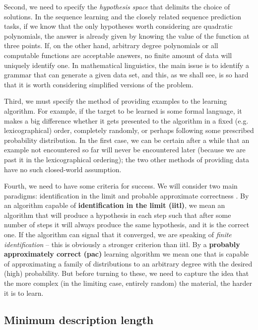Second, we need to specify the {\it hypothesis space} that delimits the choice
of solutions. In the sequence learning and the closely related sequence
prediction tasks, if we know that the only hypotheses worth considering are
quadratic polynomials, the answer is already given by knowing the value of the
function at three points. If, on the other hand, arbitrary degree polynomials
or all computable functions are acceptable answers, no finite amount of data
will uniquely identify one. In mathematical linguistics, the main issue is to
identify a grammar that can generate a given data set, and this, as we shall
see, is so hard that it is worth considering simplified versions of the
problem.

Third, we must specify the method of providing examples to the learning
algorithm. For example, if the target to be learned is some formal language,
it makes a big difference whether it gets presented to the algorithm in a
fixed (e.g. lexicographical) order, completely randomly, or perhaps following
some prescribed probability distribution. In the first case, we can be certain
after a while that an example not encountered so far will never be encountered
later (because we are past it in the lexicographical ordering); the two other
methods of providing data have no such closed-world assumption.

Fourth, we need to have some criteria for success. We will consider two main
paradigms: identification in the limit \cite{Gold:1967} and probable
approximate correctness \cite{Valiant:1984}.  By an algorithm capable of {\bf
  identification in the limit (iitl)}, we mean an algorithm that will produce
a hypothesis in each step such
that after some number of steps it will always produce the same hypothesis,
and it is the correct one. If the algorithm can signal that it converged, we
are speaking of {\it finite identification} -- this is obviously a stronger
criterion than iitl. By a {\bf probably approximately correct
  (pac)} learning algorithm we mean
one that is capable of approximating a family of distributions to an arbitrary
degree with the desired (high) probability. But before turning to these, we
need to capture the idea that the more complex (in the limiting case, entirely
random) the material, the harder it is to learn.

\subsection{Minimum description length}

